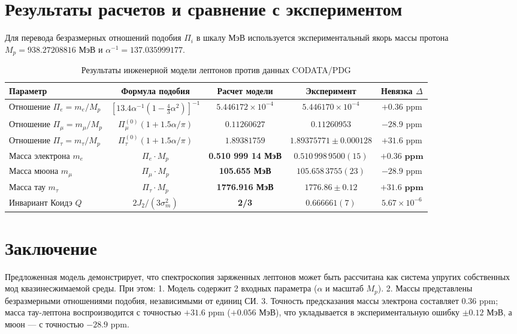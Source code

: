 \documentclass[11pt,a4paper]{article}
\theoremstyle{definition}
\theoremstyle{remark}
\begin{document}
\section{Результаты расчетов и сравнение с экспериментом}
Для перевода безразмерных отношений подобия $\Pi_i$ в шкалу МэВ используется экспериментальный якорь массы протона $M_p = 938.27208816\text{ МэВ}$ и $\alpha^{-1} = 137.035999177$.

\begin{table}[h]
\centering
\small
\caption{Результаты инженерной модели лептонов против данных CODATA/PDG}
\label{tab:results}
\vspace{2mm}
\begin{tabular}{lcccc}
\toprule
\textbf{Параметр} & \textbf{Формула подобия} & \textbf{Расчет модели} & \textbf{Эксперимент} & \textbf{Невязка $\Delta$} \\
\midrule
Отношение $\Pi_e = m_e/M_p$ & $[13.4 \alpha^{-1}(1 - \frac{4}{3}\alpha^2)]^{-1}$ & $5.446172 \times 10^{-4}$ & $5.446170 \times 10^{-4}$ & $+0.36\text{ ppm}$ \\
Отношение $\Pi_\mu = m_\mu/M_p$ & $\Pi_\mu^{(0)} (1 + 1.5\alpha/\pi)$ & $0.11260627$ & $0.11260953$ & $-28.9\text{ ppm}$ \\
Отношение $\Pi_\tau = m_\tau/M_p$ & $\Pi_\tau^{(0)} (1 + 1.5\alpha/\pi)$ & $1.89381759$ & $1.89375771 \pm 0.000128$ & $+31.6\text{ ppm}$ \\
\midrule
Масса электрона $m_e$ & $\Pi_e \cdot M_p$ & \textbf{0.510 999 14 МэВ} & $0.510\,998\,9500(15)$ & $\mathbf{+0.36\text{ ppm}}$ \\
Масса мюона $m_\mu$ & $\Pi_\mu \cdot M_p$ & \textbf{105.655 МэВ} & $105.658\,3755(23)$ & $-28.9\text{ ppm}$ \\
Масса тау $m_\tau$ & $\Pi_\tau \cdot M_p$ & \textbf{1776.916 МэВ} & $1776.86 \pm 0.12$ & $\mathbf{+31.6\text{ ppm}}$ \\
Инвариант Коидэ $Q$ & $2 J_2 / (3 \sigma_m^2)$ & \textbf{2/3} & $0.666661(7)$ & $5.67 \times 10^{-6}$ \\
\bottomrule
\end{tabular}
\end{table}

\section{Заключение}
Предложенная модель демонстрирует, что спектроскопия заряженных лептонов может быть рассчитана как система упругих собственных мод квазинесжимаемой среды. При этом:
1. Модель содержит 2 входных параметра ($\alpha$ и масштаб $M_p$).
2. Массы представлены безразмерными отношениями подобия, независимыми от единиц СИ.
3. Точность предсказания массы электрона составляет $0.36\text{ ppm}$; масса тау-лептона воспроизводится с точностью $+31.6\text{ ppm}$ ($+0.056$ МэВ), что укладывается в экспериментальную ошибку $\pm 0.12$ МэВ, а мюон — с точностью $-28.9\text{ ppm}$.
\end{document}
